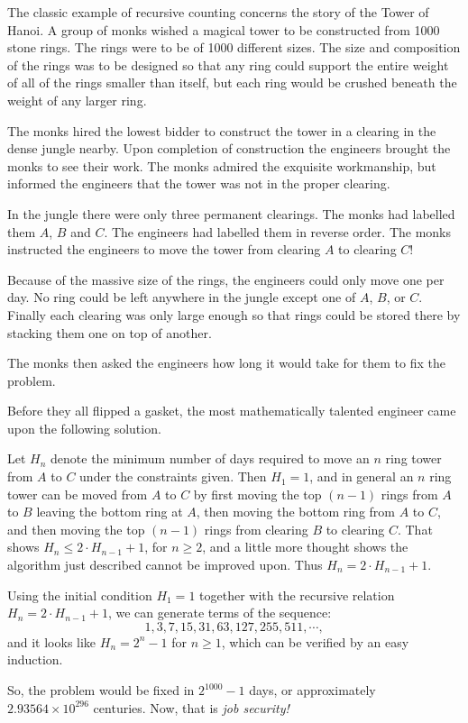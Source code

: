 \begin{exmp} The classic example of recursive counting 
 concerns the story of the 
 Tower of Hanoi. 
 A group of monks wished a magical tower to be constructed from 1000 stone rings.
 The rings were to be of 1000 different sizes. The size and composition of the rings was to
 be  designed so that any ring could support the entire weight of all of the rings
 smaller than itself, but each ring would be crushed beneath the weight of any larger ring.
 
 The monks hired the lowest bidder to construct the tower in a clearing in the dense jungle nearby.
 Upon completion of construction the engineers brought the monks to see their work.
 The monks admired the exquisite workmanship, but informed the engineers that the tower
 was not in the proper clearing.
 
 In the jungle there were only three permanent clearings. The monks had labelled them $A$, $B$ and
 $C$. The engineers had labelled them in reverse order. The monks instructed the engineers to move
 the tower from clearing $A$ to clearing $C$!
 
 Because of the massive size of the rings, the engineers could only move one per day. No ring
 could be left anywhere in the jungle except one of $A$, $B$, or $C$. Finally each clearing
 was only large enough so that rings could be stored there by stacking them one on top of another. 
 
 The monks then asked the engineers how long it would take for them to fix the problem.
 
 Before they all flipped a gasket, the most mathematically talented engineer came upon the
 following solution.
 
 Let $H_n$ denote the minimum number of days required to move an $n$ ring tower from $A$ to $C$
 under the constraints given. Then $H_1=1$, and in general an $n$ ring tower can be moved
 from $A$ to $C$ by first moving the top $(n-1)$ rings from $A$ to $B$ leaving the bottom ring at $A$,
 then moving the bottom ring from $A$ to $C$, and then moving the top $(n-1)$ rings from clearing
 $B$ to clearing $C$. That shows $H_n\leq2\cdot H_{n-1} + 1$, for $n\geq 2$, and a little more
 thought shows the algorithm just described cannot be improved upon. Thus
 $H_n=2\cdot H_{n-1} + 1$. 
 
 Using the initial condition  $H_1=1$ together with the recursive relation 
 $H_n=2\cdot H_{n-1} + 1$, we can generate terms of the sequence:
 \[
   1, 3, 7, 15, 31, 63, 127, 255, 511, \cdots,
 \] 
 and it looks like $H_n = 2^n-1$
 for $n \geq 1$, which can be verified by an easy induction.
 
 So, the problem would be fixed in $2^{1000}-1$ days, or approximately 
 $2.93564 \times 10^{296}$ centuries. Now, that is \emph{job security!}
\end{exmp}

